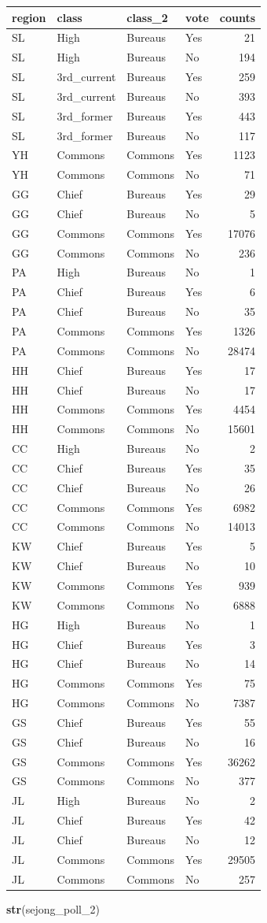 \documentclass[
]{article}
\newenvironment{Shaded}{\begin{snugshade}}{\end{snugshade}}
\newcommand{\DecValTok}[1]{\textcolor[rgb]{0.00,0.00,0.81}{#1}}
\newcommand{\KeywordTok}[1]{\textcolor[rgb]{0.13,0.29,0.53}{\textbf{#1}}}
\newcommand{\NormalTok}[1]{#1}
\begin{document}
\begin{longtable}[]{@{}llllr@{}}
\toprule
region & class & class\_2 & vote & counts\tabularnewline
\midrule
\endhead
SL & High & Bureaus & Yes & 21\tabularnewline
SL & High & Bureaus & No & 194\tabularnewline
SL & 3rd\_current & Bureaus & Yes & 259\tabularnewline
SL & 3rd\_current & Bureaus & No & 393\tabularnewline
SL & 3rd\_former & Bureaus & Yes & 443\tabularnewline
SL & 3rd\_former & Bureaus & No & 117\tabularnewline
YH & Commons & Commons & Yes & 1123\tabularnewline
YH & Commons & Commons & No & 71\tabularnewline
GG & Chief & Bureaus & Yes & 29\tabularnewline
GG & Chief & Bureaus & No & 5\tabularnewline
GG & Commons & Commons & Yes & 17076\tabularnewline
GG & Commons & Commons & No & 236\tabularnewline
PA & High & Bureaus & No & 1\tabularnewline
PA & Chief & Bureaus & Yes & 6\tabularnewline
PA & Chief & Bureaus & No & 35\tabularnewline
PA & Commons & Commons & Yes & 1326\tabularnewline
PA & Commons & Commons & No & 28474\tabularnewline
HH & Chief & Bureaus & Yes & 17\tabularnewline
HH & Chief & Bureaus & No & 17\tabularnewline
HH & Commons & Commons & Yes & 4454\tabularnewline
HH & Commons & Commons & No & 15601\tabularnewline
CC & High & Bureaus & No & 2\tabularnewline
CC & Chief & Bureaus & Yes & 35\tabularnewline
CC & Chief & Bureaus & No & 26\tabularnewline
CC & Commons & Commons & Yes & 6982\tabularnewline
CC & Commons & Commons & No & 14013\tabularnewline
KW & Chief & Bureaus & Yes & 5\tabularnewline
KW & Chief & Bureaus & No & 10\tabularnewline
KW & Commons & Commons & Yes & 939\tabularnewline
KW & Commons & Commons & No & 6888\tabularnewline
HG & High & Bureaus & No & 1\tabularnewline
HG & Chief & Bureaus & Yes & 3\tabularnewline
HG & Chief & Bureaus & No & 14\tabularnewline
HG & Commons & Commons & Yes & 75\tabularnewline
HG & Commons & Commons & No & 7387\tabularnewline
GS & Chief & Bureaus & Yes & 55\tabularnewline
GS & Chief & Bureaus & No & 16\tabularnewline
GS & Commons & Commons & Yes & 36262\tabularnewline
GS & Commons & Commons & No & 377\tabularnewline
JL & High & Bureaus & No & 2\tabularnewline
JL & Chief & Bureaus & Yes & 42\tabularnewline
JL & Chief & Bureaus & No & 12\tabularnewline
JL & Commons & Commons & Yes & 29505\tabularnewline
JL & Commons & Commons & No & 257\tabularnewline
\bottomrule
\end{longtable}

\begin{Shaded}
\begin{Highlighting}[]
\KeywordTok{str}\NormalTok{(sejong\_poll\_}\DecValTok{2}\NormalTok{)}
\end{Highlighting}
\end{Shaded}
\end{document}

